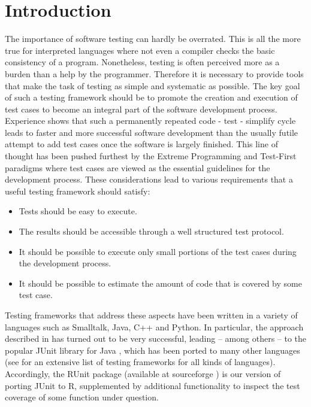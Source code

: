 \documentclass[12pt, a4paper]{article}
\begin{document}
\section{Introduction}
The importance of software testing can hardly be overrated. This
is all the more true for interpreted languages where not even a compiler
checks the basic consistency of a program. Nonetheless, testing is
often perceived more as a burden than a help  by the
programmer. Therefore it is necessary to provide tools that make the
task  of testing as simple and systematic as possible. The key goal of
such a testing framework should be to promote the creation and
execution of test cases to become an integral part of the software
development process. Experience shows that such a permanently repeated
code - test - simplify  cycle leads to faster and more successful
software development than the usually futile attempt to add test cases
once the software is largely finished. This line of thought has been
pushed furthest by the Extreme Programming
\cite{xp} and Test-First paradigms
where test cases are viewed as the essential guidelines for the
development process. These considerations lead to various requirements
that a useful testing framework should satisfy:
\begin {itemize}
\item {Tests should be easy to execute.}
\item {The results should be accessible through a well structured test
    protocol.}
\item{It should be possible to execute only small portions of the test
    cases during the development process.}
\item{It should be possible to estimate the amount of code that is
    covered by some test case.}
\end {itemize}


Testing frameworks that address these aspects have been written in a
variety of languages such as Smalltalk, Java, C++ and Python. In
particular, the approach described in \cite{beck} has turned out to be
very successful, leading -- among others -- to the popular JUnit
library for Java \cite{junit}, which has
been ported to many other languages (see \cite{xp} for an extensive list of testing
frameworks for all kinds of languages). Accordingly, the RUnit package (available at sourceforge \cite{runit-sf}) is our
version of  porting JUnit to R, supplemented by additional
functionality to inspect the test coverage of some function under question.
\end{document}
